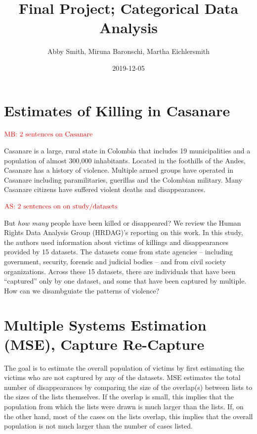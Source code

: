 \documentclass[]{article}
\title{Final Project; Categorical Data Analysis}
\author{Abby Smith, Miruna Baronschi, Martha Eichlersmith}
\date{2019-12-05}
\begin{document}
\maketitle

\hypertarget{estimates-of-killing-in-casanare}{%
\section{Estimates of Killing in
Casanare}\label{estimates-of-killing-in-casanare}}

\(\textcolor{red}{\text{MB: 2 sentences on Casanare}}\)

Casanare is a large, rural state in Colombia that includes 19
municipalities and a population of almost 300,000 inhabitants. Located
in the foothills of the Andes, Casanare has a history of violence.
Multiple armed groups have operated in Casanare including
paramilitaries, guerillas and the Colombian military. Many Casanare
citizens have suffered violent deaths and disappearances.

\(\textcolor{red}{\text{AS: 2 sentences on on study/datasets}}\)

But \emph{how many} people have been killed or disappeared? We review
the Human Rights Data Analysis Group (HRDAG)'s reporting on this work.
In this study, the authors used information about victims of killings
and disappearances provided by 15 datasets. The datasets come from state
agencies -- including government, security, forensic and judicial bodies
-- and from civil society organizations. Across these 15 datasets, there
are individuals that have been ``captured'' only by one dataset, and
some that have been captured by multiple. How can we disambguiate the
patterns of violence?

\hypertarget{multiple-systems-estimation-mse-capture-re-capture}{%
\section{Multiple Systems Estimation (MSE), Capture
Re-Capture}\label{multiple-systems-estimation-mse-capture-re-capture}}

The goal is to estimate the overall population of victims by first
estimating the victims who are not captured by any of the datasets. MSE
estimates the total number of disappearances by comparing the size of
the overlap(s) between lists to the sizes of the lists themselves. If
the overlap is small, this implies that the population from which the
lists were drawn is much larger than the lists. If, on the other hand,
most of the cases on the lists overlap, this implies that the overall
population is not much larger than the number of cases listed.
\end{document}
